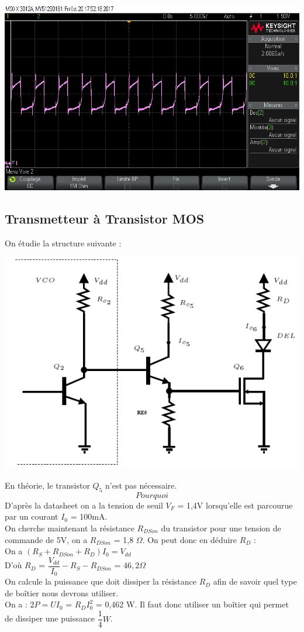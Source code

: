 \documentclass[a4paper]{report}
\begin{document}
\begin{center}
\includegraphics[width=1\textwidth]{Courant_diode_opt.png}
\end{center}



\subsection{Transmetteur à Transistor MOS}
On étudie la structure suivante : \\
\begin{center}
\includegraphics[width=.5\textwidth]{transimos.PNG}
\end{center}

En théorie, le transistor $Q_5$ n'est pas nécessaire.\\
$$Pourquoi$$
D'après la datasheet on a la tension de seuil $V_F$ = 1,4V lorsqu'elle est parcourue par un courant $I_0$ = 100mA.\\
On cherche maintenant la résistance $R_{DSon}$ du transistor pour une tension de commande de 5V, on a $R_{DSon}$ = 1,8 $\Omega$. On peut donc en déduire $R_D$ :\\
On a $(R_S + R_{DSon} + R_D) I_0 = V_{dd}$\\
D'où $R_D$ = $\dfrac{V_{dd}}{I_0} - R_S -R_{DSon}$ = $46,2 \Omega$\\
On calcule la puissance que doit dissiper la résistance $R_D$ afin de savoir quel type de boîtier nous devrons utiliser.\\
On a : $2P = UI_0$ = $R_DI_0^2$ = 0,462 W. Il faut donc utiliser un boîtier qui permet de dissiper une puissance $\dfrac{1}{4}W$.\\
\end{document}
